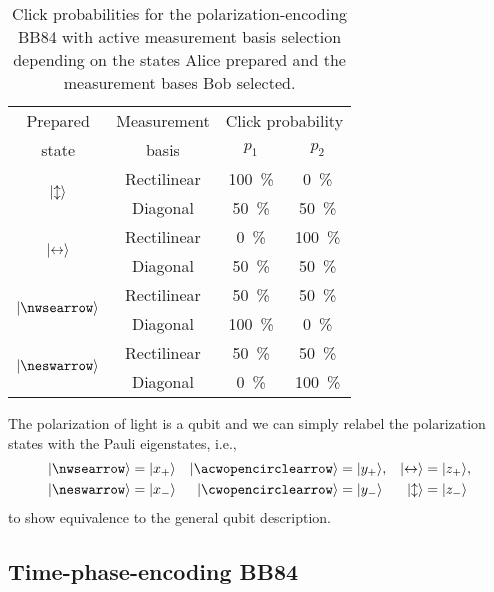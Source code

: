 \begin{table}[htb]
	\centering
	\begin{tabular}{cccc}
		\toprule
		Prepared & Measurement & \multicolumn{2}{c}{Click probability} \\
		state & basis & $p_1$ & $p_2$ \\
		\midrule
		\multirow{2}{*}{$\lvert\updownarrow\rangle$} & Rectilinear & \SI{100}{\percent} & \SI{0}{\percent} \\
		& Diagonal & \SI{50}{\percent} & \SI{50}{\percent} \\
		\cmidrule{1-2}
		\multirow{2}{*}{$\lvert\leftrightarrow\rangle$} & Rectilinear & \SI{0}{\percent} & \SI{100}{\percent} \\
		& Diagonal & \SI{50}{\percent} & \SI{50}{\percent} \\
		\cmidrule{1-2}
		\multirow{2}{*}{$\ket{\nwsearrow}$} & Rectilinear & \SI{50}{\percent} & \SI{50}{\percent} \\
		& Diagonal & \SI{100}{\percent} & \SI{0}{\percent} \\
		\cmidrule{1-2}
		\multirow{2}{*}{$\ket{\neswarrow}$} & Rectilinear & \SI{50}{\percent} & \SI{50}{\percent} \\
		& Diagonal & \SI{0}{\percent} & \SI{100}{\percent} \\
		\bottomrule
	\end{tabular}
	\caption{Click probabilities for the polarization-encoding BB84 with active measurement basis selection depending on the states Alice prepared and the measurement bases Bob selected.}\label{tab:bb84_polarization_clicks}
\end{table}
The polarization of light is a qubit and we can simply relabel the polarization states with the Pauli eigenstates, i.e.,
\begin{align}
	\ket{\nwsearrow}
	&=
	\ket{x_+}
	&
	\ket{\acwopencirclearrow}
	&=
	\ket{y_+},
	&
	\ket{\leftrightarrow}
	&=
	\ket{z_+},
	\\
	\ket{\neswarrow}
	&=
	\ket{x_-}
	&
	\ket{\cwopencirclearrow}
	&=
	\ket{y_-}
	&
	\ket{\updownarrow}
	&=
	\ket{z_-}
\end{align}
to show equivalence to the general qubit description.

\FloatBarrier
\subsection{Time-phase-encoding BB84}

